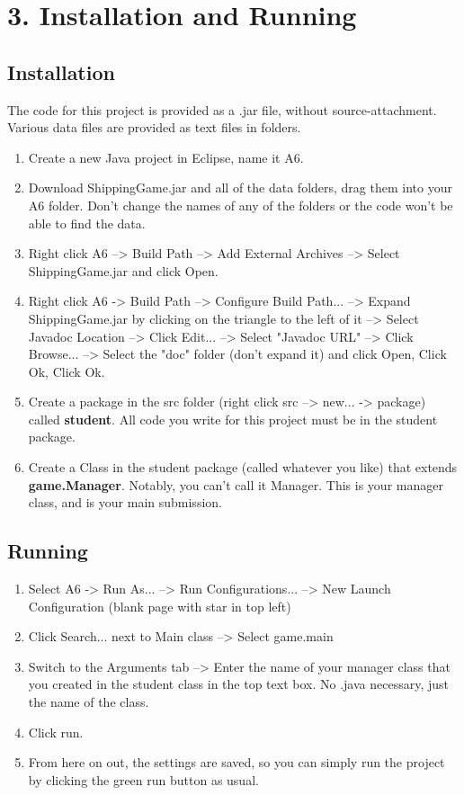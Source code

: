 \documentclass[11pt]{article}
\begin{document}
\newpage
\section{3. Installation and Running}
\subsection{Installation}
The code for this project is provided as a .jar file, without source-attachment. Various data files are provided as text files in folders.
\begin{enumerate}
\item Create a new Java project in Eclipse, name it A6.
\item Download ShippingGame.jar and all of the data folders, drag them into your A6 folder. Don't change the names of any of the folders or the code won't be able to find the data.
\item Right click A6 --> Build Path --> Add External Archives --> Select ShippingGame.jar and click Open.
\item Right click A6 -> Build Path --> Configure Build Path... --> Expand ShippingGame.jar by clicking on the triangle to the left of it --> Select Javadoc Location --> Click Edit... --> Select "Javadoc URL" --> Click Browse... --> Select the "doc" folder (don't expand it) and click Open, Click Ok, Click Ok.
\item Create a package in the src folder (right click src --> new... -> package) called \textbf{student}. All code you write for this project must be in the student package.
\item Create a Class in the student package (called whatever you like) that extends \textbf{game.Manager}. Notably, you can't call it Manager. This is your manager class, and is your main submission.
\end{enumerate}

\subsection{Running}
\begin{enumerate}
\item Select A6 -> Run As... --> Run Configurations... --> New Launch Configuration (blank page with star in top left)
\item Click Search... next to Main class --> Select game.main
\item Switch to the Arguments tab --> Enter the name of your manager class that you created in the student class in the top text box. No .java necessary, just the name of the class.
\item Click run.
\item From here on out, the settings are saved, so you can simply run the project by clicking the green run button as usual.
\end{enumerate}
\end{document}
